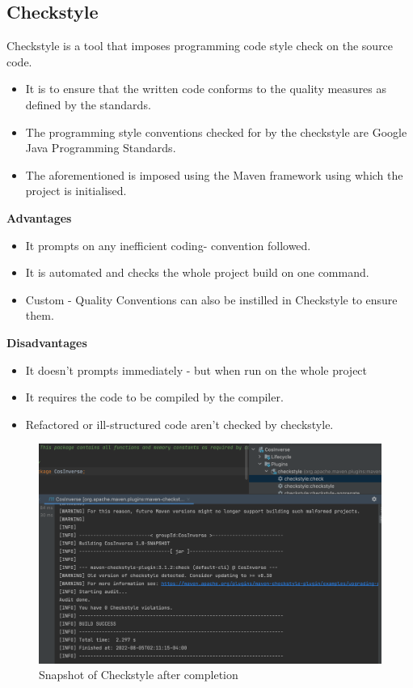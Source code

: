\documentclass[a4paper,12pt]{article}
\begin{document}
\subsection{Checkstyle \cite{Checkstyle}}
Checkstyle is a tool that imposes programming code style check on the source code. 
    \begin{itemize}
        \item {It is to ensure that the written code conforms to the quality measures as defined by the standards.}
        \item{The programming style conventions checked for by the checkstyle are Google Java Programming Standards.}
        \item{The aforementioned is imposed using the Maven framework using which the project is initialised. }
    \end{itemize}
    \textbf{Advantages}
    \begin{itemize}
     \item{It prompts on any inefficient coding- convention followed.}
     \item{It is automated and checks the whole project build on one command.}
     \item{Custom - Quality Conventions can also be instilled in Checkstyle to ensure them.}
    \end{itemize}
    \textbf{Disadvantages}
    \begin{itemize}
     \item{It doesn't prompts immediately - but when run on the whole project}
     \item{It requires the code to be compiled by the compiler.}
     \item{Refactored or ill-structured code aren't checked by checkstyle.}
    \end{itemize}
    \begin{figure}
     \centering
     \includegraphics[scale=0.5]{Check.png}
     \caption{Snapshot of Checkstyle after completion}
    \end{figure}
    
\end{document}
